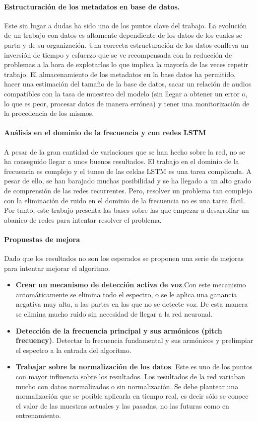 \paragraph{Estructuración de los metadatos en base de datos.} Este sin lugar a dudas ha sido uno de los puntos clave del trabajo. La evolución de un trabajo con datos es altamente dependiente de los datos de los cuales se parta y de su organización. Una correcta estructuración de los datos conlleva un inversión de tiempo y esfuerzo que se ve recompensada con la reducción de problemas a la hora de explotarlos lo que implica la mayoría de las veces repetir trabajo. El almacenamiento de los metadatos en la base datos ha permitido, hacer una estimación del tamaño de la base de datos, sacar un relación de audios compatibles con la tasa de muestreo del modelo (sin llegar a obtener un error o, lo que es peor, procesar datos de manera errónea) y tener una monitorización de la procedencia de los mismos.

\paragraph{Análisis en el dominio de la frecuencia y con redes \gls{LSTM}}
A pesar de la gran cantidad de variaciones que se han hecho sobre la red, no se ha conseguido llegar a unos buenos resultados. El trabajo en el dominio de la frecuencia es complejo y el tuneo de las celdas \gls{LSTM} es una tarea complicada. A pesar de ello, se han barajado muchas posibilidad y se ha llegado a un alto grado de comprensión de las redes recurrentes. Pero, resolver un problema tan complejo con la eliminación de ruido en el dominio de la frecuencia no es una tarea fácil. Por tanto, este trabajo presenta las bases sobre las que empezar a desarrollar un abanico de redes para intentar resolver el problema.

\paragraph{Propuestas de mejora}
Dado que los resultados no son los esperados se proponen una serie de mejoras para intentar mejorar el algoritmo.
\begin{itemize}
	\item \textbf{Crear un mecanismo de detección activa de voz}.Con este mecanismo automáticamente se elimina todo el espectro, o se le aplica una ganancia negativa muy alta, a las partes en las que no se detecte voz. De esta manera se elimina mucho ruido sin necesidad de llegar a la red neuronal.
	\item \textbf{Detección de la frecuencia principal y sus armónicos (pitch frecuency)}. Detectar la frecuencia fundamental y sus armónicos y prelimpiar el espectro a la entrada del algoritmo.
	\item \textbf{Trabajar sobre la normalización de los datos}. Este es uno de los puntos con mayor influencia sobre los resultados. Los resultados de la red variaban mucho con datos normalizados o sin normalización. Se debe plantear una normalización que se posible aplicarla en tiempo real, es decir sólo se conoce el valor de las muestras actuales y las pasadas, no las futuras como en entrenamiento.
\end{itemize}